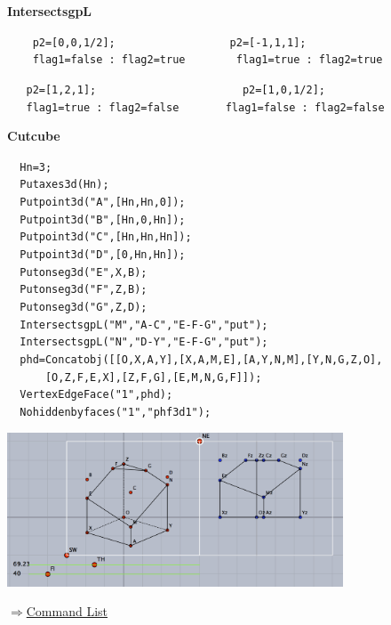\documentclass[papersize,a4paper,12pt]{article}
\newenvironment{cmd}[2]{
\hypertarget{#2}{}
\begin{center}{\bf\large #1}\end{center}
\begin{description}
}{
\end{description}
\begin{flushright} \hyperlink{functionlist}{$\Rightarrow$Command List}\end{flushright}
}
\begin{document}
\begin{cmd}{IntersectsgpL}{intersectsgpL}
\verb|    p2=[0,0,1/2];                  p2=[-1,1,1];|\\
\verb|    flag1=false : flag2=true        flag1=true : flag2=true |\\


\hspace*{20mm}
\begin{minipage}{60mm}

\end{minipage}\hspace{10mm}%
\begin{minipage}{60mm}

\end{minipage}

\verb|   p2=[1,2,1];                       p2=[1,0,1/2];|\\
\verb|   flag1=true : flag2=false　　    flag1=false : flag2=false |

\hspace*{20mm}
\begin{minipage}{60mm}

\end{minipage}\hspace{10mm}%
\begin{minipage}{60mm}

\end{minipage}

{\bf Cutcube}

\verb|  Hn=3; |\\
\verb|  Putaxes3d(Hn); |\\
\verb|  Putpoint3d("A",[Hn,Hn,0]); |\\
\verb|  Putpoint3d("B",[Hn,0,Hn]); |\\
\verb|  Putpoint3d("C",[Hn,Hn,Hn]); |\\
\verb|  Putpoint3d("D",[0,Hn,Hn]); |\\
\verb|  Putonseg3d("E",X,B);  |\\
\verb|  Putonseg3d("F",Z,B);  |\\
\verb|  Putonseg3d("G",Z,D);  |\\
\verb|  IntersectsgpL("M","A-C","E-F-G","put");  |\\
\verb|  IntersectsgpL("N","D-Y","E-F-G","put");  |\\
\verb|  phd=Concatobj([[O,X,A,Y],[X,A,M,E],[A,Y,N,M],[Y,N,G,Z,O], |\\
\verb|      [O,Z,F,E,X],[Z,F,G],[E,M,N,G,F]]); |\\
\verb|  VertexEdgeFace("1",phd); |\\
\verb|  Nohiddenbyfaces("1","phf3d1");  |

\hspace{20mm}\includegraphics[bb=0.00 0.00 713.04 327.02,width=10cm]{Fig/IntersectsgpL0.pdf}


\end{cmd}
\end{document}
